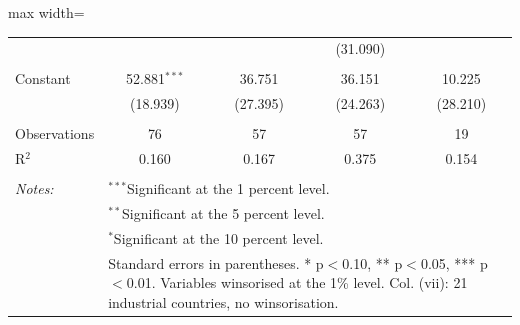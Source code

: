 \documentclass[11pt]{article}
\begin{document}
\begin{table}[!htbp]
\begin{adjustbox}{max width=\linewidth}
\begin{tabular}{@{\extracolsep{5pt}}lcccc}
  &  &  & (31.090) &  \\ 
  & & & & \\ 
 Constant & 52.881$^{***}$ & 36.751 & 36.151 & 10.225 \\ 
  & (18.939) & (27.395) & (24.263) & (28.210) \\ 
  & & & & \\ 
Observations & 76 & 57 & 57 & 19 \\ 
R$^{2}$ & 0.160 & 0.167 & 0.375 & 0.154 \\ 
\hline \\[-1.8ex] 
\textit{Notes:} & \multicolumn{4}{l}{$^{***}$Significant at the 1 percent level.} \\ 
 & \multicolumn{4}{l}{$^{**}$Significant at the 5 percent level.} \\ 
 & \multicolumn{4}{l}{$^{*}$Significant at the 10 percent level.} \\ 
 & \multicolumn{4}{l}{Standard errors in parentheses. * p$<$0.10, ** p$<$0.05, *** p$<$0.01. Variables winsorised at the 1\% level. Col. (vii): 21 industrial countries, no winsorisation.} \\ 
\end{tabular}
\end{adjustbox} 
\end{table} 
\end{document}
